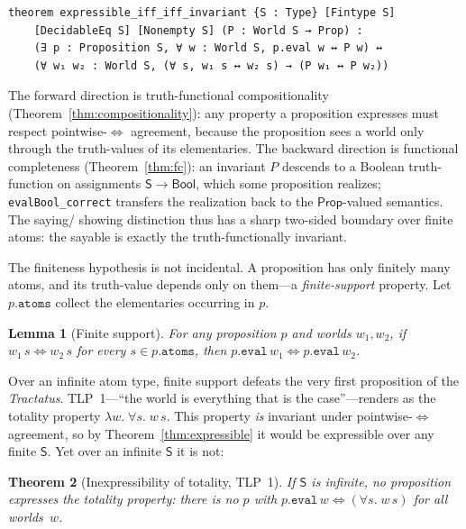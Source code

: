 \documentclass[jsl,bibother]{asl}
\newtheorem{theorem}{Theorem}[section]
\newtheorem{lemma}[theorem]{Lemma}
\theoremstyle{definition}
\theoremstyle{remark}
\newcommand{\Sach}{\mathsf{S}}
\newcommand{\Prop}{\mathsf{Prop}}
\begin{document}
\begin{lstlisting}
theorem expressible_iff_iff_invariant {S : Type} [Fintype S]
    [DecidableEq S] [Nonempty S] (P : World S → Prop) :
    (∃ p : Proposition S, ∀ w : World S, p.eval w ↔ P w) ↔
    (∀ w₁ w₂ : World S, (∀ s, w₁ s ↔ w₂ s) → (P w₁ ↔ P w₂))
\end{lstlisting}

\noindent
The forward direction is truth-functional compositionality
(Theorem~\ref{thm:compositionality}): any property a proposition
expresses must respect pointwise-$\iff$ agreement, because the
proposition sees a world only through the truth-values of its
elementaries.  The backward direction is functional completeness
(Theorem~\ref{thm:fc}): an invariant $P$ descends to a Boolean
truth-function on assignments $\Sach \to \mathsf{Bool}$, which
some proposition realizes; \texttt{evalBool\_correct} transfers
the realization back to the $\Prop$-valued semantics.  The saying/
showing distinction thus has a sharp two-sided boundary over
finite atoms: the sayable is exactly the truth-functionally
invariant.

The finiteness hypothesis is not incidental.  A proposition has
only finitely many atoms, and its truth-value depends only on
them---a \emph{finite-support} property.  Let
$p.\mathtt{atoms}$ collect the elementaries occurring in $p$.

\begin{lemma}[Finite support]
\label{lem:finitesupport}
For any proposition $p$ and worlds $w_1, w_2$, if
$w_1\,s \iff w_2\,s$ for every $s \in p.\mathtt{atoms}$, then
$p.\mathtt{eval}\,w_1 \iff p.\mathtt{eval}\,w_2$.
\end{lemma}

\noindent
Over an infinite atom type, finite support defeats the very first
proposition of the \emph{Tractatus}.  TLP~1---``the world is
everything that is the case''---renders as the totality property
$\lambda w.\;\forall s.\; w\,s$.  This property \emph{is}
invariant under pointwise-$\iff$ agreement, so by
Theorem~\ref{thm:expressible} it would be expressible over any
finite $\Sach$.  Yet over an infinite $\Sach$ it is not:

\begin{theorem}[Inexpressibility of totality, TLP~1]
\label{thm:totality}
If $\Sach$ is infinite, no proposition expresses the totality
property: there is no $p$ with
$p.\mathtt{eval}\,w \iff (\forall s.\; w\,s)$ for all worlds~$w$.
\end{theorem}
\end{document}
